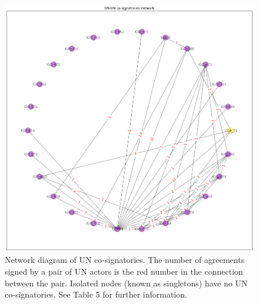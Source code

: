\documentclass{article}
\begin{document}
\begin{figure}[H]
\begin{center}
\includegraphics[scale=0.38]{./assets/figure_3.png}
\caption{Network diagram of UN co-signatories. The number of agreements signed by a pair of UN actors is the red number in the connection between the pair. Isolated nodes (known as singletons) have no UN co-signatories. See Table 5 for further information.}
\end{center}
\end{figure}
\end{document}

